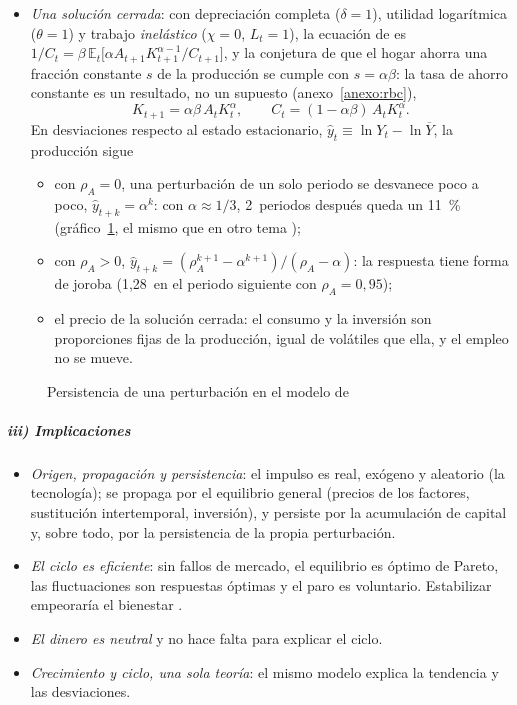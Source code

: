 \documentclass[11pt]{article}
\begin{document}
\begin{itemize}
\item \emph{Una solución cerrada}\nocite{McCallum1989Real}: con depreciación completa ($\delta=1$), utilidad logarítmica ($\theta=1$) y trabajo \emph{inelástico} ($\chi=0$, $L_t=1$), la ecuación de  es $1/C_t=\beta\,\mathbb{E}_t\big[\alpha A_{t+1}K_{t+1}^{\alpha-1}/C_{t+1}\big]$, y la conjetura de que el hogar ahorra una fracción constante $s$ de la producción se cumple con $s=\alpha\beta$: la tasa de ahorro constante es un resultado, no un supuesto (anexo~\ref{anexo:rbc}),
  \begin{equation*}
  K_{t+1}=\alpha\beta\,A_tK_t^{\alpha},\qquad C_t=(1-\alpha\beta)\,A_tK_t^{\alpha}.
  \end{equation*}
  En desviaciones respecto al estado estacionario, $\hat y_t\equiv\ln Y_t-\ln\overline Y$, la producción sigue
  \begin{itemize}
  \item con $\rho_A=0$, una perturbación de un solo periodo se desvanece poco a poco, $\hat y_{t+k}=\alpha^k$: con $\alpha\approx1/3$, 2~periodos después queda un 11~\% (gráfico~\ref{fig:persistencia-mccallum}, el mismo que en otro tema );
  \item con $\rho_A>0$, $\hat y_{t+k}=(\rho_A^{k+1}-\alpha^{k+1})/(\rho_A-\alpha)$: la respuesta tiene forma de joroba (1,28~en el periodo siguiente con $\rho_A=0{,}95$);
  \item el precio de la solución cerrada: el consumo y la inversión son proporciones fijas de la producción, igual de volátiles que ella, y el empleo no se mueve.
  \end{itemize}
\end{itemize}

\begin{figure}[H]
\centering
\caption{Persistencia de una perturbación en el modelo de }\label{fig:persistencia-mccallum}
\end{figure}

\subparagraph{iii) Implicaciones}

\begin{itemize}
\item \emph{Origen, propagación y persistencia}: el impulso es real, exógeno y aleatorio (la tecnología); se propaga por el equilibrio general (precios de los factores, sustitución intertemporal, inversión), y persiste por la acumulación de capital y, sobre todo, por la persistencia de la propia perturbación.
\item \emph{El ciclo es eficiente}: sin fallos de mercado, el equilibrio es óptimo de Pareto, las fluctuaciones son respuestas óptimas y el paro es voluntario. Estabilizar empeoraría el bienestar .
\item \emph{El dinero es neutral} y no hace falta para explicar el ciclo.
\item \emph{Crecimiento y ciclo, una sola teoría}: el mismo modelo explica la tendencia y las desviaciones.
\end{itemize}
\end{document}

